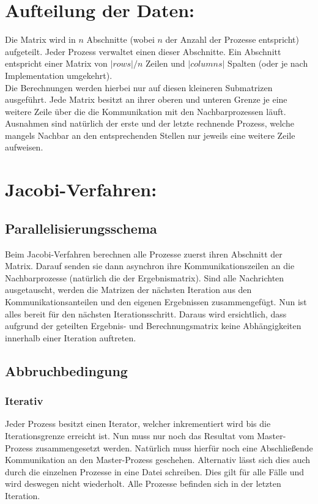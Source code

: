 \documentclass[a4paper,11pt,fleqn]{scrartcl}
\title{\titleinfo}
\author{\authorinfo}
\begin{document}
\maketitle
\notag

\section{Aufteilung der Daten:}
Die Matrix wird in \(n\) Abschnitte (wobei \(n\) der Anzahl der Prozesse entspricht) aufgeteilt.
Jeder Prozess verwaltet einen dieser Abschnitte. 
Ein Abschnitt entspricht einer Matrix von \(|rows| / n\) Zeilen und \(|columns|\) Spalten (oder je nach Implementation umgekehrt). \\
Die Berechnungen werden hierbei nur auf diesen kleineren Submatrizen ausgeführt.
Jede Matrix besitzt an ihrer oberen und unteren Grenze je eine weitere Zeile über die die Kommunikation mit den Nachbarprozessen läuft. 
Ausnahmen sind natürlich der erste und der letzte rechnende Prozess, welche mangels Nachbar an den entsprechenden Stellen nur jeweils eine weitere Zeile aufweisen.

\section{Jacobi-Verfahren:}
\subsection{Parallelisierungsschema}
Beim Jacobi-Verfahren berechnen alle Prozesse zuerst ihren Abschnitt der Matrix. 
Darauf senden sie dann asynchron ihre Kommunikationszeilen an die Nachbarprozesse (natürlich die der Ergebnismatrix).
Sind alle Nachrichten ausgetauscht, werden die Matrizen der nächsten Iteration aus den Kommunikationsanteilen und den eigenen Ergebnissen zusammengefügt.
Nun ist alles bereit für den nächsten Iterationsschritt.
Daraus wird ersichtlich, dass aufgrund der geteilten Ergebnis- und Berechnungsmatrix keine Abhängigkeiten innerhalb einer Iteration auftreten.
	
\subsection{Abbruchbedingung}
\subsubsection{Iterativ}
Jeder Prozess besitzt einen Iterator, welcher inkrementiert wird bis die Iterationsgrenze erreicht ist.
Nun muss nur noch das Resultat vom Master-Prozess zusammengesetzt werden.
Natürlich muss hierfür noch eine Abschließende Kommunikation an den Master-Prozess geschehen.
Alternativ lässt sich dies auch durch die einzelnen Prozesse in eine Datei schreiben.
Dies gilt für alle Fälle und wird deswegen nicht wiederholt.
Alle Prozesse befinden sich in der letzten Iteration.
\end{document}
